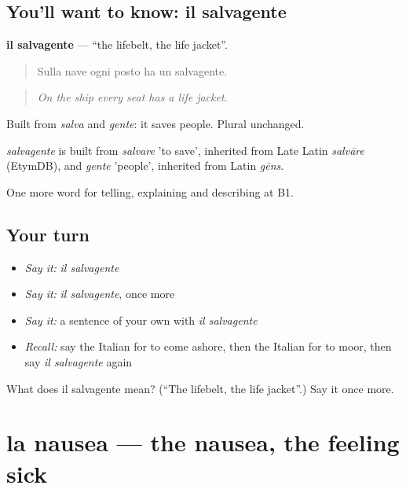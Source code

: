 \subsection*{You'll want to know: il salvagente}
\textbf{il salvagente} — \textquotedblleft{}the lifebelt, the life jacket\textquotedblright{}.

\begin{quote}
Sulla nave ogni posto ha un salvagente.
\end{quote}

\begin{quote}
\emph{On the ship every seat has a life jacket.}
\end{quote}

Built from \emph{salva} and \emph{gente}: it saves people. Plural unchanged.

\begin{cousinweb}
\emph{salvagente} is built from \emph{salvare} 'to save', inherited from Late Latin \emph{salvāre} (EtymDB), and \emph{gente} 'people', inherited from Latin \emph{gēns}.
\end{cousinweb}

\begin{grammarlens}[title={What you've built}]
One more word for telling, explaining and describing at B1.
\end{grammarlens}

\subsection*{Your turn}
\begin{itemize}
\raggedright
  \item \emph{Say it:} \emph{il salvagente}
  \item \emph{Say it:} \emph{il salvagente}, once more
  \item \emph{Say it:} a sentence of your own with \emph{il salvagente}
  \item \emph{Recall:} say the Italian for to come ashore, then the Italian for to moor, then say \emph{il salvagente} again
\end{itemize}

\begin{tcolorbox}[breakable,colback=teal!4,colframe=teal!35!black,title={Before you move on}]
What does il salvagente mean? (\textquotedblleft{}The lifebelt, the life jacket\textquotedblright{}.) Say it once more.
\end{tcolorbox}
\section[la nausea]{la nausea — the nausea, the feeling sick}

